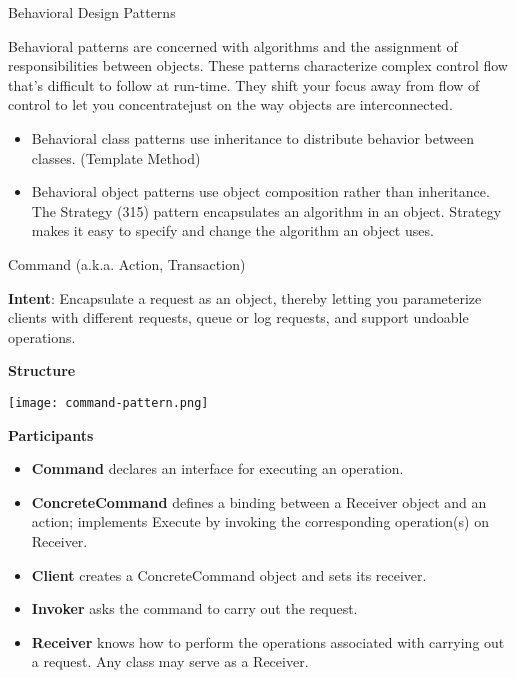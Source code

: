 \documentclass{beamer}
\author[Chris Simpkins] 
{Christopher Simpkins \\\texttt{chris.simpkins@gatech.edu}}
\institute[Georgia Tech] %
\date[CS 1331]{}
\begin{document}
\begin{frame}
  \titlepage
\end{frame}

\begin{frame}[fragile]{Behavioral Design Patterns}


Behavioral patterns are concerned with algorithms and the assignment of responsibilities between objects.  These patterns characterize complex control flow that's difficult to follow at run-time. They shift your focus away from flow of control to let you concentratejust on the way objects are interconnected.
\begin{itemize}
\item Behavioral class patterns use inheritance to distribute behavior between classes. (Template Method)
\item Behavioral object patterns use object composition rather than inheritance. The Strategy (315) pattern encapsulates an algorithm in an object. Strategy makes it easy to specify and change the algorithm an object uses.
\end{itemize}


\end{frame}

\begin{frame}[fragile]{Command (a.k.a. Action, Transaction)}

\vspace{-.075in}
{\bf Intent}: Encapsulate a request as an object, thereby letting you parameterize clients with different requests, queue or log requests, and support undoable operations.

{\bf Structure}
\vspace{-.1in}
\begin{center}
\texttt{[image: command-pattern.png]}\\
\end{center}
\vspace{-.175in}
{\bf Participants}
\begin{itemize}
\item {\bf Command} declares an interface for executing an operation.
\item {\bf ConcreteCommand} defines a binding between a Receiver object and an action; implements Execute by invoking the corresponding operation(s) on Receiver.
\item {\bf Client} creates a ConcreteCommand object and sets its receiver.
\item {\bf Invoker} asks the command to carry out the request.
\item {\bf Receiver} knows how to perform the operations associated with carrying out a request. Any class may serve as a Receiver.
\end{itemize}


\end{frame}
\end{document}
